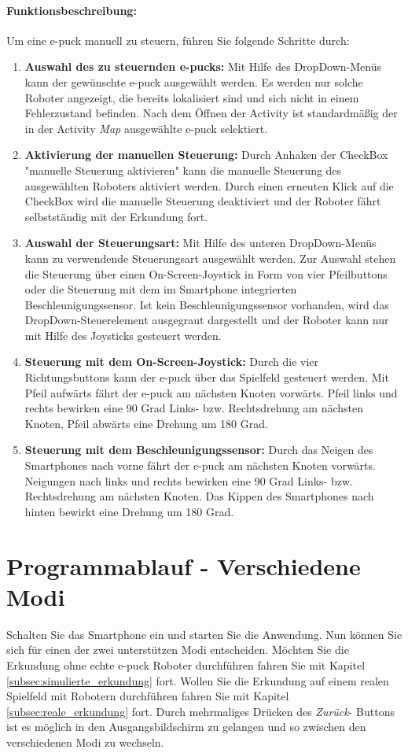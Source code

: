 \documentclass[10pt,a4paper]{article}
\let\oldsection\section
\renewcommand{\section}{\newpage \oldsection}
\begin{document}
 		\paragraph*{Funktionsbeschreibung:}
 		Um eine e-puck manuell zu steuern, führen Sie folgende Schritte durch:
 		\begin{enumerate}
 			\item \textbf{Auswahl des zu steuernden e-pucks:} Mit Hilfe des DropDown-Menüs kann der gewünschte e-puck ausgewählt werden. Es werden
 			nur solche Roboter angezeigt, die bereits lokalisiert sind und sich nicht in einem Fehlerzustand befinden. Nach dem Öffnen der Activity
 			ist standardmäßig der in der Activity \textit{Map} ausgewählte e-puck selektiert. 
 			\item \textbf{Aktivierung der manuellen Steuerung:} Durch Anhaken der CheckBox "manuelle Steuerung aktivieren" kann die manuelle 
 			Steuerung des ausgewählten Roboters aktiviert werden. Durch einen erneuten Klick auf die CheckBox wird die manuelle Steuerung deaktiviert
 			und der Roboter fährt selbstständig mit der Erkundung fort.
 			\item \textbf{Auswahl der Steuerungsart:} Mit Hilfe des unteren DropDown-Menüs kann zu verwendende Steuerungsart ausgewählt werden. Zur
 			Auswahl stehen die Steuerung über einen On-Screen-Joystick in Form von vier Pfeilbuttons oder die Steuerung mit dem im Smartphone
 			integrierten Beschleunigungssensor. Ist kein Beschleunigungssensor vorhanden, wird das DropDown-Steuerelement ausgegraut dargestellt und
 			der Roboter kann nur mit Hilfe des Joysticks gesteuert werden.
 			\item \textbf{Steuerung mit dem On-Screen-Joystick:} Durch die vier Richtungsbuttons kann der e-puck über das Spielfeld gesteuert werden.
 			Mit Pfeil aufwärts fährt der e-puck am nächsten Knoten vorwärts. Pfeil links und rechts bewirken eine 90 Grad Links- bzw. Rechtsdrehung
 			am nächsten Knoten, Pfeil abwärts eine Drehung um 180 Grad.
 			\item \textbf{Steuerung mit dem Beschleunigungssensor:}
 			Durch das Neigen des Smartphones nach vorne fährt der e-puck am nächsten Knoten vorwärts. Neigungen nach links und rechts bewirken eine
 			90 Grad Links- bzw. Rechtsdrehung am nächsten Knoten. Das Kippen des Smartphones nach hinten bewirkt eine Drehung um 180 Grad.
 		\end{enumerate}


\section{Programmablauf - Verschiedene Modi}
\label{programmstart_ablauf}
		Schalten Sie das Smartphone ein und starten Sie die Anwendung. Nun k\"onnen Sie sich f\"ur einen der zwei unterst\"utzen Modi entscheiden. M\"ochten Sie
		die Erkundung ohne echte e-puck Roboter durchf\"uhren fahren Sie mit  Kapitel \ref{subsec:simulierte_erkundung} fort. Wollen Sie die Erkundung auf einem
		realen Spielfeld mit Robotern durchf\"uhren fahren Sie mit Kapitel  \ref{subsec:reale_erkundung} fort. Durch mehrmaliges Dr\"ucken des \textit{Zur\"uck}-
		Buttons ist es m\"oglich in den Ausgangsbildschirm zu gelangen und so zwischen den verschiedenen Modi zu wechseln.
\end{document}
